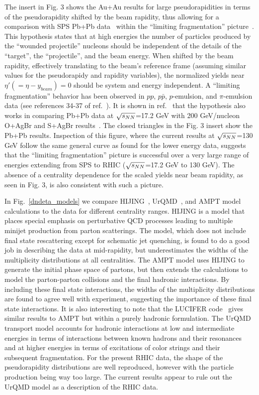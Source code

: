 \documentclass[singlespacing]{elsart}
\begin{document}
The insert in Fig. 3 shows the Au+Au results for large
pseudorapidities in terms of the 
pseudorapidity shifted by the beam rapidity, thus allowing 
for a comparison with
SPS Pb+Pb data~\cite{deines00} within the ``limiting fragmentation'' 
picture~\cite{benecke69}.
This hypothesis states that at high energies the number of particles 
produced by the
``wounded projectile'' nucleons should be independent of the details of the
``target'', the ``projectile'', 
and the beam energy.   When shifted by the beam rapidity,
effectively translating to the beam's reference frame (assuming
similar values for the pseudorapidy and rapidity variables), 
the normalized yields near $\eta' (=\eta - y_{beam}) = 0$ should be system 
and energy
independent.  A ``limiting fragmentation'' behavior
has been observed  in
$pp$, $p\bar{p}$, $p$-emulsion, and $\pi$-emulsion data 
(see references 34-37 of ref.~\cite{deines00}).  It is shown in
ref.~\cite{deines00} that the hypothesis also works in comparing
Pb+Pb data at $\sqrt{s_{\small{NN}}}$=17.2 GeV with   
200 GeV/nucleon O+AgBr and S+AgBr results~\cite{dabrowska93}. 
The closed triangles in the Fig. 3 insert show the Pb+Pb results. Inspection
of this figure, where the current results at  $\sqrt{s_{\small{NN}}}$=130 GeV
follow the same general curve as found for the lower energy data,
suggests that the ``limiting fragmentation''  picture is successful over a
very large range of energies extending from SPS to RHIC 
($\sqrt{s_{\small{NN}}}$=17.2 GeV to 130 GeV). The absence of a centrality
dependence for the scaled yields near beam rapidity, 
as seen in Fig. 3, is also consistent with such a picture.

In Fig.~\ref{dndeta_models} we compare HIJING~\cite{wang91},
UrQMD~\cite{urqmd},  and AMPT model~\cite{zhang01,lin01a,lin01b} 
calculations to the data for
different centrality
ranges.  HIJING is a model that places special
emphasis on  perturbative QCD processes leading to 
multiple minijet production from parton scatterings. The model, which
does not include final state rescattering except for schematic
jet quenching, is found to 
do a good job in describing the data at mid-rapidity, but
underestimates the widths of the multiplicity distributions at
all centralities.  The AMPT model uses HIJING to generate the
initial phase space of partons, but then extends the calculations to
model the parton-parton collisions and the final
hadronic interactions. By including these final state interactions,
the widths of the multiplicity distributions are found to agree well with
experiment, suggesting the importance of these final state interactions.
It is also interesting to note that the LUCIFER code~\cite{lucifer} 
gives similar results to AMPT but within a purely hadronic formulation. 
The UrQMD transport 
model accounts for 
hadronic interactions at low and intermediate energies in
terms of interactions between known hadrons and their resonances and
at higher energies in terms of excitations of color strings and their 
subsequent fragmentation.  
For the present RHIC data, the shape of the pseudorapidity distributions
are well reproduced, however with the particle production being way too large.
The current results appear to rule out the UrQMD model as a description of the 
RHIC data.
    
\end{document}
